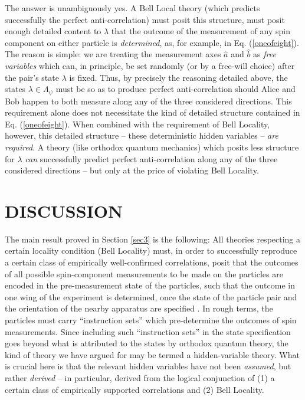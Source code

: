 \documentclass[aps,prc,onecolumn,12pt]{revtex4-2}
\begin{document}
The answer is unambiguously yes.  A Bell Local theory (which predicts
successfully the perfect anti-correlation) must posit this structure,
must posit enough detailed content to $\lambda$ that the outcome of
the measurement of any spin component on either particle is
\emph{determined}, as, for example, in Eq. (\ref{oneofeight}).  The
reason is simple:  we are treating the measurement axes $\hat{a}$ and
$\hat{b}$ as \emph{free variables} which can, in principle, be set
randomly (or by a free-will choice) after the pair's state $\lambda$
is fixed.  Thus, by precisely the reasoning detailed above, the states
$\lambda \in  \Lambda_\psi $ must be so as to produce perfect
anti-correlation should Alice and Bob happen to both measure along any
of the three considered directions.  This requirement alone does not
necessitate the kind of detailed structure contained in
Eq. (\ref{oneofeight}).  When combined with the requirement of Bell
Locality, however, this detailed structure -- these deterministic
hidden variables -- \emph{are required}.  A theory (like
orthodox quantum mechanics) which posits less structure for
$\lambda$ \emph{can}
successfully predict perfect anti-correlation along any of the three
considered directions -- but only at the price of violating Bell Locality.


\section{DISCUSSION}
\label{sec4}


The main result proved in Section \ref{sec3}
is the following:  All theories
respecting a certain locality condition (Bell Locality) must, in order
to successfully reproduce a certain class of empirically
well-confirmed correlations, posit that the outcomes of all
possible spin-component measurements to be made on the particles are
encoded in the pre-measurement state of the particles, such that the
outcome in one wing of the experiment is determined, once the
state of the particle pair and the orientation of the nearby apparatus
are specified \cite{fine}.
In rough terms, the particles must carry ``instruction
sets'' \cite{instructionsets}
which pre-determine the outcomes of spin measurements.  Since
including such ``instruction sets'' in the state specification goes
beyond what is attributed to the states by orthodox quantum theory,
the kind of theory we have argued for may be termed a hidden-variable
theory.  What is crucial here is that the relevant hidden variables
have not been \emph{assumed}, but rather \emph{derived} -- in
particular, derived from the logical conjunction of (1)
a certain class of empirically supported correlations and
(2) Bell Locality.
\end{document}

